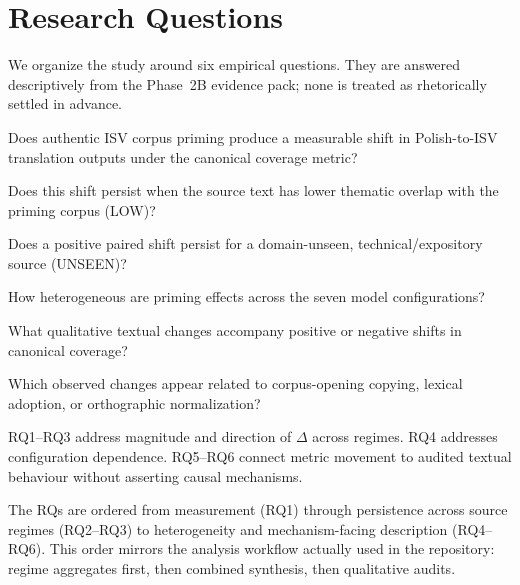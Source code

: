 \section{Research Questions}
\label{sec:rq}

We organize the study around six empirical questions.
They are answered descriptively from the Phase~2B evidence pack; none is treated as rhetorically settled in advance.

\begin{description}[style=nextline,leftmargin=1.2cm,font=\normalfont\bfseries]
  \item[RQ1] Does authentic ISV corpus priming produce a measurable shift in Polish-to-ISV translation outputs under the canonical coverage metric?
  \item[RQ2] Does this shift persist when the source text has lower thematic overlap with the priming corpus (LOW)?
  \item[RQ3] Does a positive paired shift persist for a domain-unseen, technical/expository source (UNSEEN)?
  \item[RQ4] How heterogeneous are priming effects across the seven model configurations?
  \item[RQ5] What qualitative textual changes accompany positive or negative shifts in canonical coverage?
  \item[RQ6] Which observed changes appear related to corpus-opening copying, lexical adoption, or orthographic normalization?
\end{description}

RQ1--RQ3 address magnitude and direction of $\Delta$ across regimes.
RQ4 addresses configuration dependence.
RQ5--RQ6 connect metric movement to audited textual behaviour without asserting causal mechanisms.


The RQs are ordered from measurement (RQ1) through persistence across source regimes (RQ2--RQ3) to heterogeneity and mechanism-facing description (RQ4--RQ6).
This order mirrors the analysis workflow actually used in the repository: regime aggregates first, then combined synthesis, then qualitative audits.
